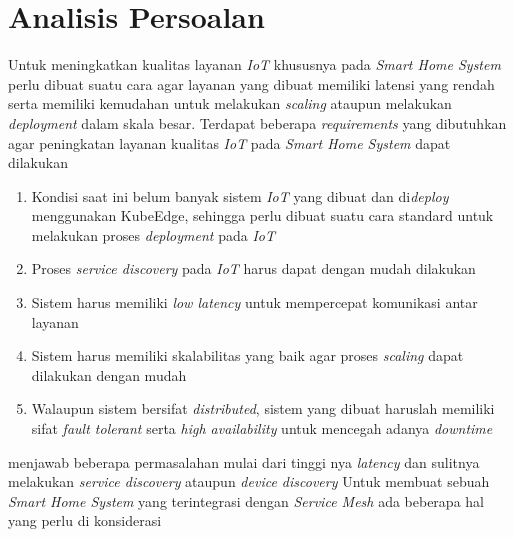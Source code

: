 \section{Analisis Persoalan}
\label{sec:analisis-persoalan}

Untuk meningkatkan kualitas layanan \textit{IoT} khususnya pada \textit{Smart Home System} perlu dibuat suatu cara agar layanan yang dibuat memiliki latensi yang rendah serta memiliki kemudahan untuk melakukan \textit{scaling} ataupun melakukan \textit{deployment} dalam skala besar. Terdapat beberapa \textit{requirements} yang dibutuhkan agar peningkatan layanan kualitas \textit{IoT} pada \textit{Smart Home System} dapat dilakukan

\begin{enumerate}
  \item Kondisi saat ini belum banyak sistem \textit{IoT} yang dibuat dan di\textit{deploy} menggunakan KubeEdge, sehingga perlu dibuat suatu cara standard untuk melakukan proses \textit{deployment} pada \textit{IoT}
  \item Proses \textit{service discovery} pada \textit{IoT} harus dapat dengan mudah dilakukan
  \item Sistem harus memiliki \textit{low latency} untuk mempercepat komunikasi antar layanan
  \item Sistem harus memiliki skalabilitas yang baik agar proses \textit{scaling} dapat dilakukan dengan mudah
  \item Walaupun sistem bersifat \textit{distributed}, sistem yang dibuat haruslah memiliki sifat \textit{fault tolerant} serta \textit{high availability} untuk mencegah adanya \textit{downtime}
\end{enumerate}


menjawab beberapa permasalahan mulai dari tinggi nya \textit{latency} dan sulitnya melakukan \textit{service discovery} ataupun \textit{device discovery}
Untuk membuat sebuah \textit{Smart Home System} yang terintegrasi dengan \textit{Service Mesh} ada beberapa hal yang perlu di konsiderasi
